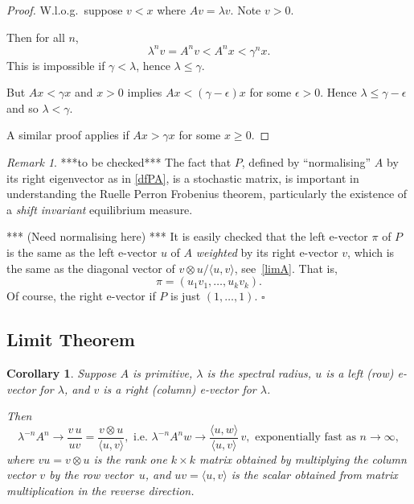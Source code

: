 \documentclass[a4paper]{amsart}
\theoremstyle{plain}
\newtheorem{corollary}[theorem]{Corollary}
\theoremstyle{definition}
\theoremstyle{remark}
\newtheorem{remark}[theorem]{Remark}
\begin{document}
\begin{proof}
 W.l.o.g.\ suppose $ v<x $ where $ Av = \lambda v $.  Note $ v>0$.
 
 Then for all $ n $, 
 \[
 \lambda ^n v = A^n v < A^n x < \gamma ^n x.
 \]
 This is impossible if $ \gamma < \lambda $, hence $ \lambda \leq \gamma $.
 
 But $ Ax < \gamma x $ and $ x>0 $ implies $ Ax < (\gamma- \epsilon) x $ for some $ \epsilon > 0 $.
 Hence $ \lambda \leq \gamma - \epsilon  $ and so $ \lambda < \gamma $.   
 
  A similar proof applies if $ Ax > \gamma x $ for some $ x \geq 0 $.
 \end{proof} 


\begin{remark}
***to be checked***  The fact that $ P $, defined by ``normalising'' $ A $  by its right eigenvector as in \eqref{dfPA}, is a stochastic matrix, is 
important in understanding the Ruelle Perron Frobenius theorem, particularly the existence of a \emph{shift invariant} equilibrium measure.  

*** (Need normalising here) *** It is easily checked that the left e-vector $ \pi $ of $  P $ is the same as the left e-vector $ u $ of $ A $ \emph{weighted} by its right e-vector $ v $, which is the same as the diagonal vector of $v\otimes u/\langle u,v \rangle  $, see~\eqref{limA}.   That is,
\[
\pi = (u_1v_1,\dots, u_kv_k) .
\]
Of course, the right e-vector if $ P $ is just $ (1,\dots, 1) $.
\hfill $\square$  \end{remark} 


\subsection{Limit Theorem}
\begin{corollary}\label{corlt}
  Suppose $ A $ is primitive, $  \lambda  $ is the spectral radius, $ u  $ is a
 left (row) e-vector for $ \lambda   $, and $ v $ is a right (column) e-vector for $ \lambda   $.

Then 
\begin{equation} \label{limA} 
  \lambda ^{-n}A^n \to \frac{v\, u }{u  v}  = \frac{v \otimes u}{  \langle u , v \rangle } ,
\text{ i.e.\ }  \lambda ^{-n}A^n w \to   \frac{ \langle u , w \rangle}{  \langle u , v \rangle }\, v ,
   \text{ exponentially fast as } n\to \infty ,
\end{equation} 
  where $ v  u  = v\otimes u $ is the rank one $ k \times k $ matrix obtained by multiplying the column vector  $v  $ by the row vector~$ u$, and $ uv = \langle u , v \rangle $ is the scalar obtained from matrix multiplication in the reverse direction.
\end{corollary}
\end{document}
